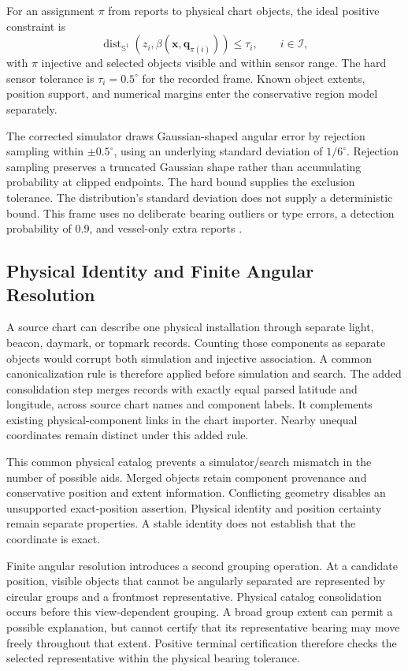 \documentclass[conference]{IEEEtran}
\newcommand{\angdist}{\operatorname{dist}_{\mathbb S^1}}
\begin{document}
For an assignment $\pi$ from reports to physical chart objects, the ideal positive constraint is
\begin{equation}
 \angdist\!\left(z_i,\beta(\mathbf{x},\mathbf{q}_{\pi(i)})\right)
 \leq \tau_i,\qquad i\in\mathcal I,
 \label{eq:point}
\end{equation}
with $\pi$ injective and selected objects visible and within sensor range. The hard sensor tolerance is $\tau_i=0.5^\circ$ for the recorded frame. Known object extents, position support, and numerical margins enter the conservative region model separately.

The corrected simulator draws Gaussian-shaped angular error by rejection sampling within $\pm0.5^\circ$, using an underlying standard deviation of $1/6^\circ$. Rejection sampling preserves a truncated Gaussian shape rather than accumulating probability at clipped endpoints. The hard bound supplies the exclusion tolerance. The distribution's standard deviation does not supply a deterministic bound. This frame uses no deliberate bearing outliers or type errors, a detection probability of $0.9$, and vessel-only extra reports \cite{Vaught2026CharlestonRecord}.

\subsection{Physical Identity and Finite Angular Resolution}
A source chart can describe one physical installation through separate light, beacon, daymark, or topmark records. Counting those components as separate objects would corrupt both simulation and injective association. A common canonicalization rule is therefore applied before simulation and search. The added consolidation step merges records with exactly equal parsed latitude and longitude, across source chart names and component labels. It complements existing physical-component links in the chart importer. Nearby unequal coordinates remain distinct under this added rule.

This common physical catalog prevents a simulator/search mismatch in the number of possible aids. Merged objects retain component provenance and conservative position and extent information. Conflicting geometry disables an unsupported exact-position assertion. Physical identity and position certainty remain separate properties. A stable identity does not establish that the coordinate is exact.

Finite angular resolution introduces a second grouping operation. At a candidate position, visible objects that cannot be angularly separated are represented by circular groups and a frontmost representative. Physical catalog consolidation occurs before this view-dependent grouping. A broad group extent can permit a possible explanation, but cannot certify that its representative bearing may move freely throughout that extent. Positive terminal certification therefore checks the selected representative within the physical bearing tolerance.
\end{document}
